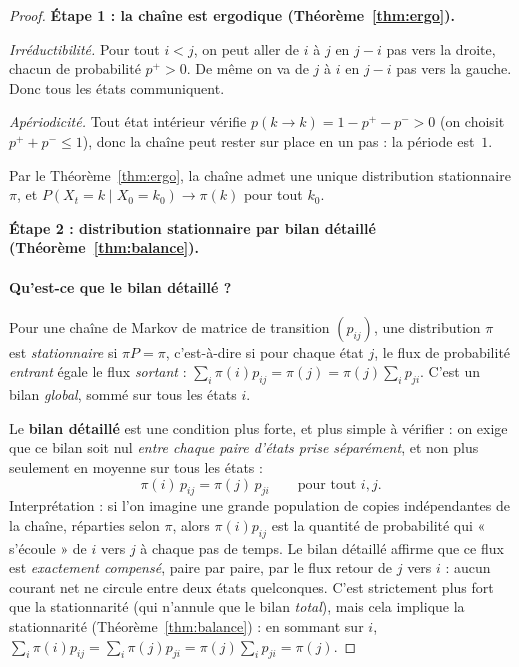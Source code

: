 \documentclass[12pt,a4paper]{article}
\theoremstyle{remark}
\begin{document}
\begin{proof}

\medskip
\textbf{Étape 1 : la chaîne est ergodique (Théorème~\ref{thm:ergo}).}

\emph{Irréductibilité.}  Pour tout $i < j$, on peut aller de $i$ à $j$ en $j-i$ pas vers
la droite, chacun de probabilité $p^+ > 0$.  De même on va de $j$ à $i$ en $j-i$ pas vers
la gauche.  Donc tous les états communiquent.

\emph{Apériodicité.}  Tout état intérieur vérifie $p(k\to k) = 1-p^+-p^- > 0$
(on choisit $p^++p^- \le 1$), donc la chaîne peut rester sur place en un pas : la période est~$1$.

Par le Théorème~\ref{thm:ergo}, la chaîne admet une unique distribution stationnaire $\pi$,
et $P(X_t=k\mid X_0=k_0)\to\pi(k)$ pour tout $k_0$.

\medskip
\textbf{Étape 2 : distribution stationnaire par bilan détaillé (Théorème~\ref{thm:balance}).}

\paragraph{Qu'est-ce que le bilan détaillé ?}
Pour une chaîne de Markov de matrice de transition $(p_{ij})$, une distribution $\pi$ est
\emph{stationnaire} si $\pi P = \pi$, c'est-à-dire si pour chaque état $j$, le flux de
probabilité \emph{entrant} égale le flux \emph{sortant} : $\sum_i \pi(i)p_{ij} = \pi(j)
= \pi(j)\sum_i p_{ji}$.  C'est un bilan \emph{global}, sommé sur tous les états $i$.

Le \textbf{bilan détaillé} est une condition plus forte, et plus simple à vérifier : on
exige que ce bilan soit nul \emph{entre chaque paire d'états prise séparément}, et non
plus seulement en moyenne sur tous les états :
\[
  \pi(i)\,p_{ij} = \pi(j)\,p_{ji} \qquad \text{pour tout } i,j.
\]
Interprétation : si l'on imagine une grande population de copies indépendantes de la
chaîne, réparties selon $\pi$, alors $\pi(i)p_{ij}$ est la quantité de probabilité qui
« s'écoule » de $i$ vers $j$ à chaque pas de temps.  Le bilan détaillé affirme que ce
flux est \emph{exactement compensé}, paire par paire, par le flux retour de $j$ vers
$i$ : aucun courant net ne circule entre deux états quelconques.  C'est strictement
plus fort que la stationnarité (qui n'annule que le bilan \emph{total}), mais cela
implique la stationnarité (Théorème~\ref{thm:balance}) : en sommant sur $i$,
$\sum_i \pi(i)p_{ij} = \sum_i \pi(j)p_{ji} = \pi(j)\sum_i p_{ji} = \pi(j)$.


\end{proof}
\end{document}
